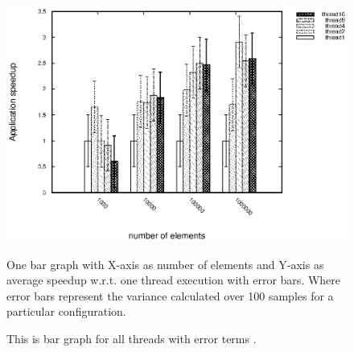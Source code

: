 \documentclass{article}
\begin{document}
\begin{figure}
\centering
\includegraphics{graphs/t4.eps}
\vspace{60pt}
 \caption{This is bar graph for all threads with error terms .}
 \vspace{30pt}
 One bar graph with X-axis as number of elements and Y-axis as average speedup  w.r.t. one thread execution with error bars.  Where error bars represent the variance calculated
over 100 samples for a particular configuration.
 \label{fig:t4}
\end{figure}
\end{document}
